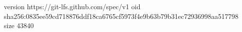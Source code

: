 version https://git-lfs.github.com/spec/v1
oid sha256:0835ee59cd718876ddf18ca6765cf5973f4e9b63b79b31ec72936998aa517798
size 43840
